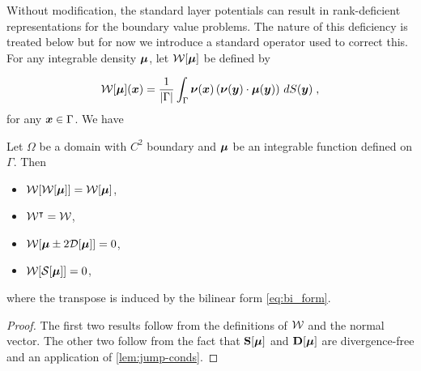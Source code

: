 Without modification, the standard layer potentials
can result in rank-deficient representations for
the boundary value problems. The nature of this deficiency
is treated below but for now we introduce a standard
operator used to correct this. For any integrable density
${\boldsymbol \mu}$, let ${\mathcal W}[{\boldsymbol \mu}]$ be defined by

\begin{equation} \label{eq:ones_operator}
  {\mathcal W}[{\boldsymbol \mu}]({\boldsymbol x}) = \frac{1}{|\Gamma|} \int_\Gamma {\boldsymbol \nu}({\boldsymbol x})
  \left ( {\boldsymbol \nu}({\boldsymbol y}) \cdot {\boldsymbol \mu}({\boldsymbol y}) \right )
  \, dS({\boldsymbol y}) \; ,
\end{equation}
for any ${\boldsymbol x} \in \Gamma$. We have

\begin{lem}
  Let $\Omega$ be a domain with $C^2$ boundary and ${\boldsymbol \mu}$ be
  an integrable function defined on $\Gamma$. Then
  \begin{itemize}
  \item ${\mathcal W}[{\mathcal W}[{\boldsymbol \mu}]] = {\mathcal W}[{\boldsymbol \mu}]$,
  \item ${\mathcal W}^\intercal = {\mathcal W}$,
  \item ${\mathcal W}[{\boldsymbol \mu} \pm 2 {\mathcal D}[{\boldsymbol \mu}]] = 0$,
  \item ${\mathcal W}[{\mathcal S}[{\boldsymbol \mu}]] = 0$,
  \end{itemize}
  where the transpose is induced by the bilinear
  form \cref{eq:bi_form}.
\end{lem}

\begin{proof}
  The first two results follow from the definitions of ${\mathcal W}$ and
  the normal vector. The other two follow from the fact that
  ${\bf S}[{\boldsymbol \mu}]$ and ${\bf D}[{\boldsymbol \mu}]$ are divergence-free and
  an application of \cref{lem:jump-conds}.
\end{proof}
